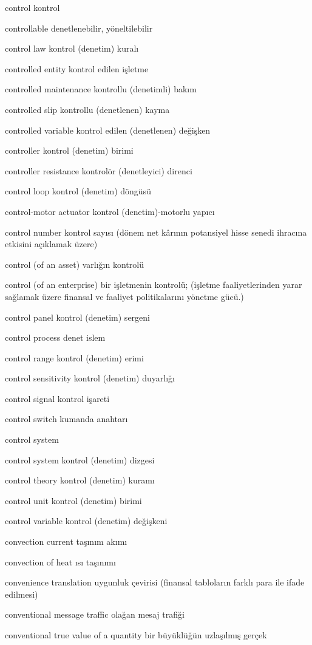 \documentclass[12pt,fleqn]{article}\usepackage{../../common}
\begin{document}
control kontrol

controllable denetlenebilir, yöneltilebilir

control law kontrol (denetim) kuralı

controlled entity kontrol edilen işletme

controlled maintenance kontrollu (denetimli) bakım

controlled slip kontrollu (denetlenen) kayma

controlled variable kontrol edilen (denetlenen) değişken

controller kontrol (denetim) birimi

controller resistance kontrolör (denetleyici) direnci

control loop kontrol (denetim) döngüsü

control-motor actuator kontrol (denetim)-motorlu yapıcı

control number kontrol sayısı (dönem net kârının potansiyel hisse senedi ihracına etkisini açıklamak üzere)

control (of an asset) varlığın kontrolü

control (of an enterprise) bir işletmenin kontrolü; (işletme faaliyetlerinden yarar sağlamak üzere finansal ve faaliyet politikalarını yönetme gücü.)

control panel kontrol (denetim) sergeni

control process denet islem

control range kontrol (denetim) erimi

control sensitivity kontrol (denetim) duyarlığı

control signal kontrol işareti

control switch kumanda anahtarı

control system

control system kontrol (denetim) dizgesi

control theory kontrol (denetim) kuramı

control unit kontrol (denetim) birimi

control variable kontrol (denetim) değişkeni

convection current taşınım akımı

convection of heat ısı taşınımı

convenience translation uygunluk çevirisi (finansal tabloların farklı para ile ifade edilmesi)

conventional message traffic olağan mesaj trafiği

conventional true value of a quantity bir büyüklüğün uzlaşılmış gerçek
\end{document}
